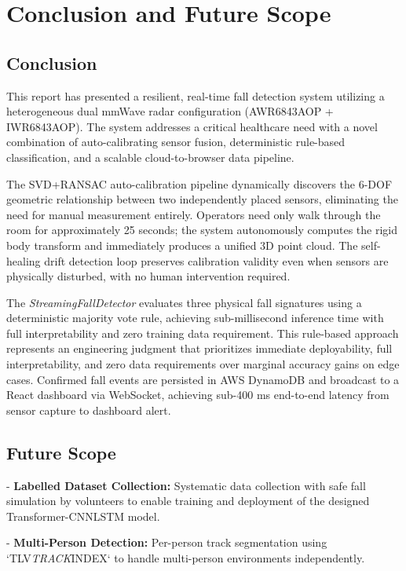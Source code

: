 \chapter{Conclusion and Future Scope}



\section{Conclusion}

This report has presented a resilient, real-time fall detection system utilizing a heterogeneous dual mmWave radar configuration (AWR6843AOP + IWR6843AOP). The system addresses a critical healthcare need with a novel combination of auto-calibrating sensor fusion, deterministic rule-based classification, and a scalable cloud-to-browser data pipeline. 

The SVD+RANSAC auto-calibration pipeline dynamically discovers the 6-DOF geometric relationship between two independently placed sensors, eliminating the need for manual measurement entirely. Operators need only walk through the room for approximately 25 seconds; the system autonomously computes the rigid body transform and immediately produces a unified 3D point cloud. The self-healing drift detection loop preserves calibration validity even when sensors are physically disturbed, with no human intervention required. 

The \textit{StreamingFallDetector} evaluates three physical fall signatures using a deterministic majority vote rule, achieving sub-millisecond inference time with full interpretability and zero training data requirement. This rule-based approach represents an engineering judgment that prioritizes immediate deployability, full interpretability, and zero data requirements over marginal accuracy gains on edge cases. Confirmed fall events are persisted in AWS DynamoDB and broadcast to a React dashboard via WebSocket, achieving sub-400 ms end-to-end latency from sensor capture to dashboard alert. 


\section{Future Scope}

- \textbf{Labelled Dataset Collection:} Systematic data collection with safe fall simulation by volunteers to enable training and deployment of the designed Transformer-CNNLSTM model. 

- \textbf{Multi-Person Detection:} Per-person track segmentation using `TLV\textit{TRACK}INDEX` to handle multi-person environments independently. 

